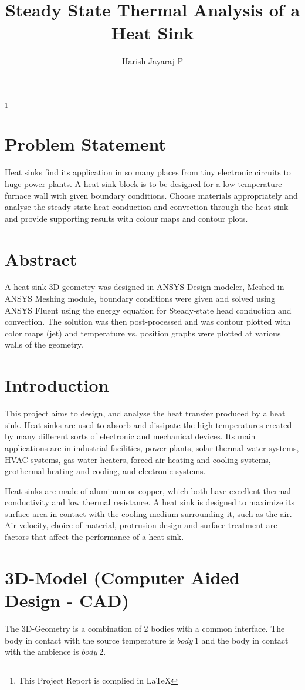 \documentclass[twoside]{article}
\title{Steady State Thermal Analysis of a Heat Sink}
\author{Harish Jayaraj P}
\date{}
\newcommand\blfootnote[1]{%
  \begingroup
  \renewcommand\thefootnote{}\footnote{#1}%
  \addtocounter{footnote}{-1}%
  \endgroup
}
\begin{document}
\onehalfspacing
\maketitle
{}
\tableofcontents
\blfootnote{\Large{This Project Report is complied in \LaTeX}}
\newpage
{}
\section{Problem Statement}
Heat sinks find its application in so many places from tiny electronic circuits to huge power plants. A heat sink block is to be designed for a low temperature furnace wall with given boundary conditions. Choose materials appropriately and analyse the steady state heat conduction and convection through the heat sink and provide supporting results with colour maps and contour plots. 
\section{Abstract}
A heat sink 3D geometry was designed in ANSYS Design-modeler, Meshed in ANSYS Meshing module, boundary conditions were given and solved using ANSYS Fluent using the energy equation for Steady-state head conduction and convection. The solution was then post-processed and was contour plotted with color maps (jet) and temperature vs. position graphs were plotted at various walls of the geometry. 

\section{Introduction}
This project aims to design, and analyse the heat transfer produced by a heat sink. Heat sinks are used to absorb and dissipate the high temperatures created by many different sorts of electronic and mechanical devices. Its main applications are in industrial facilities, power plants, solar thermal water systems, HVAC systems, gas water heaters, forced air heating and cooling systems, geothermal heating and cooling, and electronic systems. 

Heat sinks are made of aluminum or copper, which both have excellent thermal conductivity and low thermal resistance. A heat sink is designed to maximize its surface area in contact with the cooling medium surrounding it, such as the air. Air velocity, choice of material, protrusion design and surface treatment are factors that affect the performance of a heat sink. 

\section{3D-Model (Computer Aided Design - CAD)}
The 3D-Geometry is a combination of 2 bodies with a common interface. The body in contact with the source temperature is $body\ 1$ and the body in contact with the ambience is $body\ 2$. 
\end{document}
